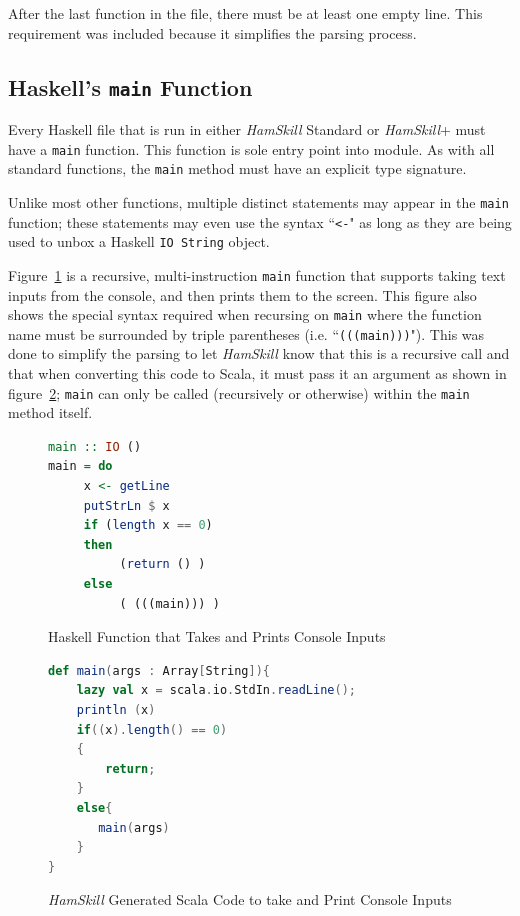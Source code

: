 \documentclass{report}
\begin{document}
After the last function in the file, there must be at least one empty line.  This requirement was included because it simplifies the parsing process.

\subsection{Haskell's \texttt{main} Function}\label{sec:mainFunction}

Every Haskell file that is run in either \textit{HamSkill} Standard or \textit{HamSkill}+ must have a \texttt{main} function.  This function is sole entry point into module.  As with all standard functions, the \texttt{main} method must have an explicit type signature.

Unlike most other functions, multiple distinct statements may appear in the \texttt{main} function; these statements may even use the syntax ``\texttt{<-}" as long as they are being used to unbox a Haskell \texttt{IO String} object.

Figure~\ref{fig:functionHaskellMainConsoleInput} is a recursive, multi-instruction \texttt{main} function that supports taking text inputs from the console, and then prints them to the screen.  This figure also shows the special syntax required when recursing on \texttt{main} where the function name must be surrounded by triple parentheses (i.e. ``\texttt{(((main)))}").  This was done to simplify the parsing to let \textit{HamSkill} know that this is a recursive call and that when converting this code to Scala, it must pass it an argument as shown in figure~\ref{fig:functionScalaMainConsoleInput}; \texttt{main} can only be called (recursively or otherwise) within the \texttt{main} method itself.

\begin{figure}[H]
\begin{mdframed}
\begin{lstlisting}[language=Haskell]
main :: IO ()
main = do 
     x <- getLine 
     putStrLn $ x
     if (length x == 0) 
     then 
          (return () )
     else
          ( (((main))) )
\end{lstlisting}
\end{mdframed}
\caption{Haskell Function that Takes and Prints Console Inputs}\label{fig:functionHaskellMainConsoleInput}
\end{figure}

\begin{figure}[H]
\begin{mdframed}
\begin{lstlisting}[language=scala]
def main(args : Array[String]){
    lazy val x = scala.io.StdIn.readLine();
    println (x)
    if((x).length() == 0)
    {
        return;
    }
    else{
       main(args)
    }
}
\end{lstlisting}
\end{mdframed}
\caption{\textit{HamSkill} Generated Scala Code to take and Print Console Inputs}\label{fig:functionScalaMainConsoleInput}
\end{figure}
\end{document}
